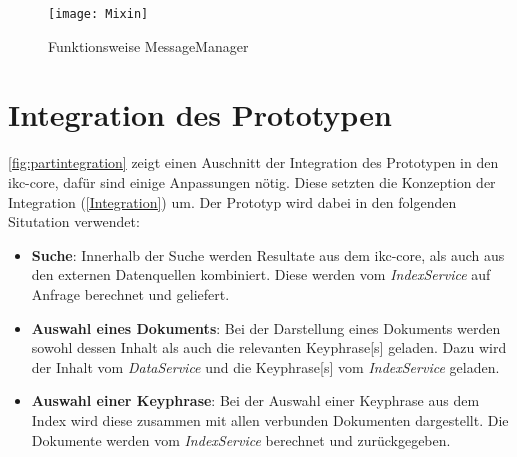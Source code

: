     \begin{figure}[H]
    \centering
    \texttt{[image: Mixin]}
    \caption{Funktionsweise MessageManager}
    \label{fig:mixin}
    \end{figure}
    

    




\section{Integration des Prototypen}


\autoref{fig:partintegration} zeigt einen Auschnitt der Integration des Prototypen in den \gls{ikc-core}, dafür sind einige Anpassungen nötig. Diese setzten die Konzeption der Integration (\autoref{Integration}) um. Der Prototyp wird dabei in den folgenden Situtation verwendet:
\begin{itemize}
    \item \textbf{Suche}: Innerhalb der Suche werden Resultate aus dem \gls{ikc-core}, als auch aus den  externen Datenquellen kombiniert. Diese werden vom \textit{IndexService} auf Anfrage berechnet und geliefert. 
    \item \textbf{Auswahl eines Dokuments}: Bei der Darstellung eines Dokuments werden sowohl dessen Inhalt als auch die relevanten \gls{Keyphrase}[s] geladen. Dazu wird der Inhalt vom \textit{DataService} und die \gls{Keyphrase}[s] vom \textit{IndexService} geladen.
    \item \textbf{Auswahl einer \gls{Keyphrase}}: Bei der Auswahl einer \gls{Keyphrase} aus dem Index wird diese zusammen mit allen verbunden Dokumenten dargestellt. Die Dokumente werden vom \textit{IndexService} berechnet und zurückgegeben.
\end{itemize}


